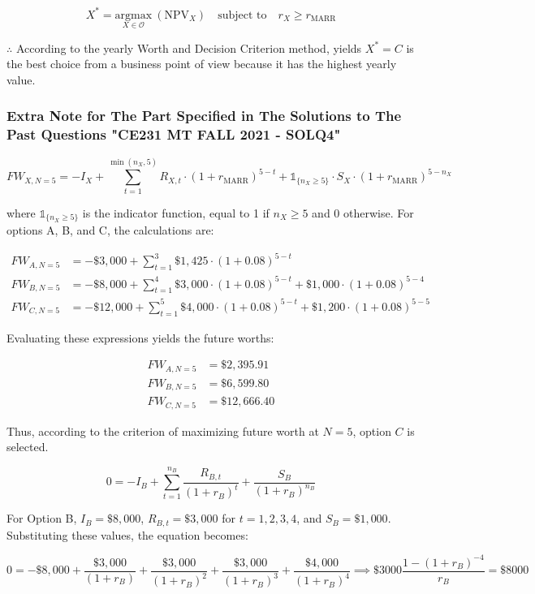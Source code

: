 \documentclass[12pt]{article}
\begin{document}
\[
X^* = \underset{X \in \mathcal{O}}{\mathrm{argmax}} \ (\text{NPV}_X) \quad \text{subject to} \quad r_X \geq r_{\text{MARR}}
\]

\(\therefore \) According to the yearly Worth and Decision Criterion method, yields \(X^* = C\) is the best choice from a business point of view because it has the highest yearly value.

\subsubsection*{Extra Note for The Part Specified in The Solutions to The Past Questions "CE231 MT FALL 2021 - SOLQ4"}
\[
FW_{X, N=5} = -I_X + \sum_{t=1}^{\min(n_X, 5)} R_{X,t} \cdot (1 + r_{\text{MARR}})^{5-t} + \mathbb{1}_{\{n_X \geq 5\}} \cdot S_X \cdot (1 + r_{\text{MARR}})^{5-n_X}
\]

where \(\mathbb{1}_{\{n_X \geq 5\}}\) is the indicator function, equal to 1 if \(n_X \geq 5\) and 0 otherwise. For options A, B, and C, the calculations are:

\[
\begin{aligned}
FW_{A, N=5} &= -\$3,000 + \sum_{t=1}^{3} \$1,425 \cdot (1 + 0.08)^{5-t} \\
FW_{B, N=5} &= -\$8,000 + \sum_{t=1}^{4} \$3,000 \cdot (1 + 0.08)^{5-t} + \$1,000 \cdot (1 + 0.08)^{5-4} \\
FW_{C, N=5} &= -\$12,000 + \sum_{t=1}^{5} \$4,000 \cdot (1 + 0.08)^{5-t} + \$1,200 \cdot (1 + 0.08)^{5-5}
\end{aligned}
\]

Evaluating these expressions yields the future worths:

\[
\begin{aligned}
FW_{A, N=5} &= \$2,395.91 \\
FW_{B, N=5} &= \$6,599.80 \\
FW_{C, N=5} &= \$12,666.40
\end{aligned}
\]

Thus, according to the criterion of maximizing future worth at \(N = 5\), option \(C\) is selected.

\[
0 = -I_B + \sum_{t=1}^{n_B} \frac{R_{B,t}}{(1 + r_B)^t} + \frac{S_B}{(1 + r_B)^{n_B}}
\]

For Option B, \( I_B = \$8,000 \), \( R_{B,t} = \$3,000 \) for \( t = 1, 2, 3, 4 \), and \( S_B = \$1,000 \). Substituting these values, the equation becomes:

\[
0 = -\$8,000 + \frac{\$3,000}{(1 + r_B)} + \frac{\$3,000}{(1 + r_B)^2} + \frac{\$3,000}{(1 + r_B)^3} + \frac{\$4,000}{(1 + r_B)^4} \implies \$ 3000 \frac{1-(1+r_B)^{-4}}{r_B}=\$8000
\]
\end{document}
